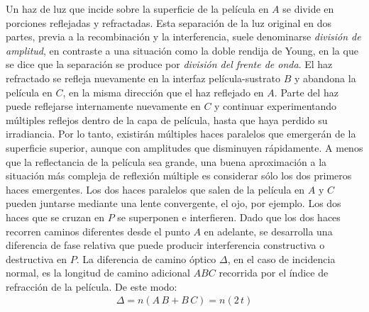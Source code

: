 \documentclass[14pt]{extarticle}
\begin{document}
Un haz de luz que incide sobre la superficie de la película en $A$ se divide en porciones reflejadas y refractadas. Esta separación de la luz original en dos partes, previa a la recombinación y la interferencia, suele denominarse \textit{división de amplitud}, en contraste a una situación como la doble rendija de Young, en la que se dice que la separación se produce por \textit{división del frente de onda}. El haz refractado se refleja nuevamente en la interfaz película-sustrato $B$ y abandona la película en $C$, en la misma dirección que el haz reflejado en $A$. Parte del haz puede reflejarse internamente nuevamente en $C$ y continuar experimentando múltiples reflejos dentro de la capa de película, hasta que haya perdido su irradiancia. Por lo tanto, existirán múltiples haces paralelos que emergerán de la superficie superior, aunque con amplitudes que disminuyen rápidamente. A menos que la reflectancia de la película sea grande, una buena aproximación a la situación más compleja de reflexión múltiple es considerar sólo los dos primeros haces emergentes. Los dos haces paralelos que salen de la película en $A$ y $C$ pueden juntarse mediante una lente convergente, el ojo, por ejemplo. Los dos haces que se cruzan en $P$ se superponen e interfieren. Dado que los dos haces recorren caminos diferentes desde el punto $A$ en adelante, se desarrolla una diferencia de fase relativa que puede producir interferencia constructiva o destructiva en $P$. La diferencia de camino óptico $\Delta$, en el caso de incidencia normal, es la longitud de camino adicional $ABC$ recorrida por el índice de refracción de la película. De este modo:
\begin{align}
\Delta = n (A \, B + B \, C) = n (2 \, t)
\label{eq:ecuacion_07_26}
\end{align}
\end{document}
